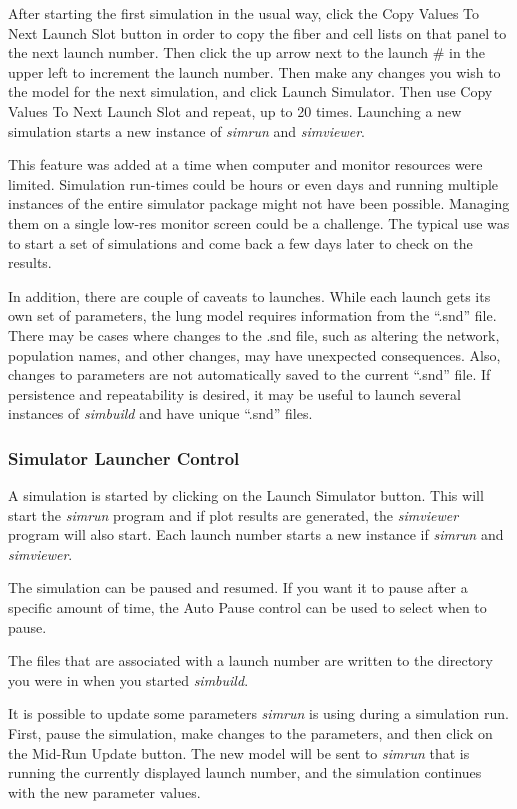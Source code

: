 \documentclass[12pt,openany,oneside]{book}
\newcommand{\prog}[1]{\textit{{#1}}}
\newcommand{\ext}[1]{{{``.#1''}}}
\begin{document}
After starting the first simulation in the usual way, click the Copy
Values To Next Launch Slot button in order to copy the fiber and cell
lists on that panel to the next launch number. Then click the up arrow
next to the launch \# in the upper left to increment the launch number.
Then make any changes you wish to the model for the next simulation, and
click Launch Simulator. Then use Copy Values To Next Launch Slot and
repeat, up to 20 times. Launching a new simulation starts a new instance
of \prog{simrun} and \prog{simviewer}.

This feature was added at a time when computer and monitor resources were
limited. Simulation run-times could be hours or even days and running
multiple instances of the entire simulator package might not have been
possible. Managing them on a single low-res monitor screen could be a
challenge. The typical use was to start a set of simulations and come back
a few days later to check on the results.

In addition, there are couple of caveats to
launches. While each launch gets its own set
of parameters, the lung model requires information from the \ext{snd}
file. There may be cases where changes to the .snd file, such as altering
the network, population names, and other changes, may have unexpected
consequences. Also, changes to parameters are not automatically saved to
the current \ext{snd} file. If persistence and repeatability is desired,
it may be useful to launch several instances of \prog{simbuild} and have
unique \ext{snd} files. 


\subsubsection{Simulator Launcher Control}

A simulation is started by clicking on the Launch Simulator button.
This will start the \prog{simrun} program and if plot results are
generated, the \prog{simviewer} program will also start.
Each launch number starts a new instance if \prog{simrun} and 
\prog{simviewer}.

The simulation can be paused and resumed. If you want it to pause after
a specific amount of time, the Auto Pause control can be used to select
when to pause.

The files that are associated with a launch number are written to the
directory you were in when you started \prog{simbuild}.

It is possible to update some parameters \prog{simrun} is using during a
simulation run. First, pause the simulation, make changes to the
parameters, and then click on the Mid-Run Update button. The new model
will be sent to \prog{simrun} that is running the currently displayed
launch number, and the simulation continues with the new parameter values.
\end{document}
